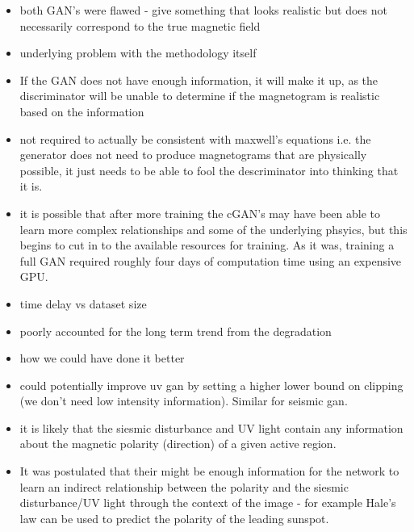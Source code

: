 \documentclass[11pt,a4paper,onecolumn]{report}
\begin{document}
\begin{itemize}
  \item both GAN's were flawed - give something that looks realistic but does
  not necessarily correspond to the true magnetic field
  \item underlying problem with the methodology itself
  \item If the GAN does not have enough information, it will make it up, as the
  discriminator will be unable to determine if the magnetogram is realistic
  based on the information

  \item not required to actually be consistent with maxwell's equations i.e. the
  generator does not need to produce magnetograms that are physically possible,
  it just needs to be able to fool the descriminator into thinking that it is.

  \item it is possible that after more training the cGAN's may have been able to
  learn more complex relationships and some of the underlying phsyics, but this
  begins to cut in to the available resources for training. As it was, training
  a full GAN required roughly four days of computation time using an expensive GPU.

  \item time delay vs dataset size

  \item poorly accounted for the long term trend from the degradation
  \item how we could have done it better
  \item could potentially improve uv gan by setting a higher lower bound on
  clipping (we don't need low intensity information). Similar for seismic gan.

  \item it is likely that the siesmic disturbance and UV light contain any
  information about the magnetic polarity (direction) of a given active region.
  \item It was postulated that their might be enough information for the network
  to learn an indirect relationship between the polarity and the siesmic
  disturbance/UV light through the context of the image - for example Hale's law
  can be used to predict the polarity of the leading sunspot.


\end{itemize}
\end{document}
